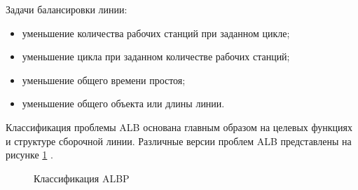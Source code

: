 Задачи балансировки линии:

\begin{itemize}
    \item уменьшение количества рабочих станций при заданном цикле;
    \item уменьшение цикла при заданном количестве рабочих станций;
    \item уменьшение общего времени простоя;
    \item уменьшение общего объекта или длины линии.
\end{itemize}

Классификация проблемы ALB основана главным образом на целевых функциях и структуре сборочной линии. Различные версии проблем ALB представлены на рисунке \ref{ris:image1} \cite{Lastra11}.

\begin{figure}[H]
    \caption{Классификация ALBP}
    \label{ris:image1}
\end{figure}

